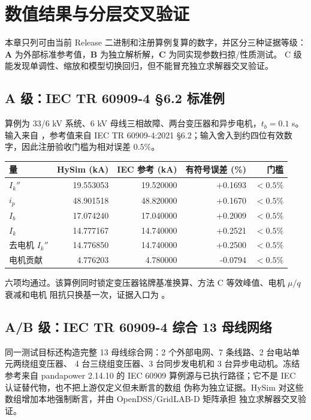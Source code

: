\section{数值结果与分层交叉验证}\label{sec:sc-numerical}

本章只列可由当前 Release 二进制和注册算例复算的数字，并区分三种证据等级：
\textbf{A} 为外部标准参考值，\textbf{B} 为独立解析解，\textbf{C} 为同实现参数扫掠/性质测试。
C 级能发现单调性、缩放和模型切换回归，但不能冒充独立求解器交叉验证。

\subsection{A 级：IEC TR 60909-4 §6.2 标准例}

算例为 33/6 kV 系统、6 kV 母线三相故障、两台变压器和异步电机，$t_b=0.1$ s。输入来自
，参考值来自 IEC TR 60909-4:2021
§6.2；输入舍入到约四位有效数字，因此注册验收门槛为相对误差 $0.5\%$。

\begin{center}\footnotesize
\begin{tabular}{@{}L{3.6cm}r r r r@{}}
\toprule
量 & HySim (kA) & IEC 参考 (kA) & 有符号误差 (\%) & 门槛\\
\midrule
$I_k''$ & 19.553053 & 19.520000 & +0.1693 & $<0.5\%$\\
$i_p$ & 48.901518 & 48.820000 & +0.1670 & $<0.5\%$\\
$I_b$ & 17.074240 & 17.040000 & +0.2009 & $<0.5\%$\\
$I_k$ & 14.777167 & 14.740000 & +0.2521 & $<0.5\%$\\
去电机 $I_k''$ & 14.776850 & 14.740000 & +0.2500 & $<0.5\%$\\
电机贡献 & 4.776203 & 4.780000 & -0.0794 & $<0.5\%$\\
\bottomrule
\end{tabular}
\end{center}
六项均通过。该算例同时锁定变压器铭牌基准换算、方法 C 等效峰值、电机 $\mu/q$ 衰减和电机
阻抗只换基一次，证据入口为 。

\subsection{A/B 级：IEC TR 60909-4 综合 13 母线网络}

同一测试目标还构造完整 13 母线综合网：2 个外部电网、7 条线路、2 台电站单元两绕组变压器、
4 台三绕组变压器、3 台同步发电机和 3 台异步电动机。冻结参考来自 pandapower 2.14.10 的
IEC 60909 算例源与已执行路径；它不是 IEC 认证替代物，也不把上游仅定义但未断言的数组
伪称为独立证据。HySim 对这些数组增加本地强制断言，并由 OpenDSS/GridLAB-D 矩阵承担
独立求解器交叉验证。

